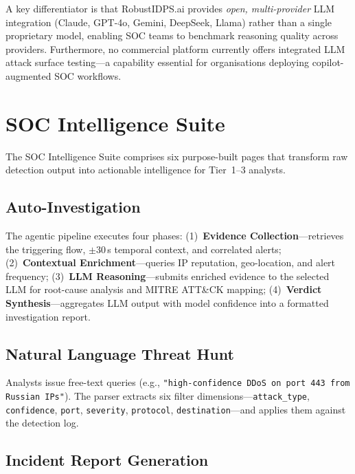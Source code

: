A key differentiator is that RobustIDPS.ai provides \emph{open, multi-provider}
LLM integration (Claude, GPT-4o, Gemini, DeepSeek, Llama) rather than a single
proprietary model, enabling SOC teams to benchmark reasoning quality across
providers.  Furthermore, no commercial platform currently offers integrated LLM
attack surface testing---a capability essential for organisations deploying
copilot-augmented SOC workflows.

\section{SOC Intelligence Suite}
\label{sec:soc_intelligence}

The SOC Intelligence Suite comprises six purpose-built pages that transform
raw detection output into actionable intelligence for Tier~1--3 analysts.

\subsection{Auto-Investigation}
\label{sec:auto_investigation}

The agentic pipeline executes four phases: (1)~\textbf{Evidence Collection}---retrieves the triggering flow, $\pm$30\,s temporal context, and correlated alerts; (2)~\textbf{Contextual Enrichment}---queries IP reputation, geo-location, and alert frequency; (3)~\textbf{LLM Reasoning}---submits enriched evidence to the selected LLM for root-cause analysis and MITRE ATT\&CK mapping; (4)~\textbf{Verdict Synthesis}---aggregates LLM output with model confidence into a formatted investigation report.

\subsection{Natural Language Threat Hunt}
\label{sec:nl_threat_hunt}

Analysts issue free-text queries (e.g., \texttt{"high-confidence DDoS on port 443 from Russian IPs"}).  The parser extracts six filter dimensions---\texttt{attack\_type}, \texttt{confidence}, \texttt{port}, \texttt{severity}, \texttt{protocol}, \texttt{destination}---and applies them against the detection log.

\subsection{Incident Report Generation}
\label{sec:incident_report}

